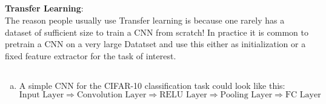 \documentclass[12pt]{article}
\begin{document}
\subsection{ }

\textbf{Transfer Learning}:\\
The reason people usually use Transfer learning is because one rarely has a dataset of sufficient size to train a CNN from scratch! In practice it is common to pretrain a CNN on a very large Datatset and use this either as initialization or a fixed feature extractor for the task of interest.


\subsection{ }
\begin{enumerate}[a)]
    \item 
        A simple CNN for the CIFAR-10 classification task could look like this:
        $$ \text{Input Layer} \Rightarrow \text{Convolution Layer} \Rightarrow \text{RELU Layer} \Rightarrow \text{Pooling Layer} \Rightarrow \text{FC Layer}$$


\end{enumerate}
\end{document}
